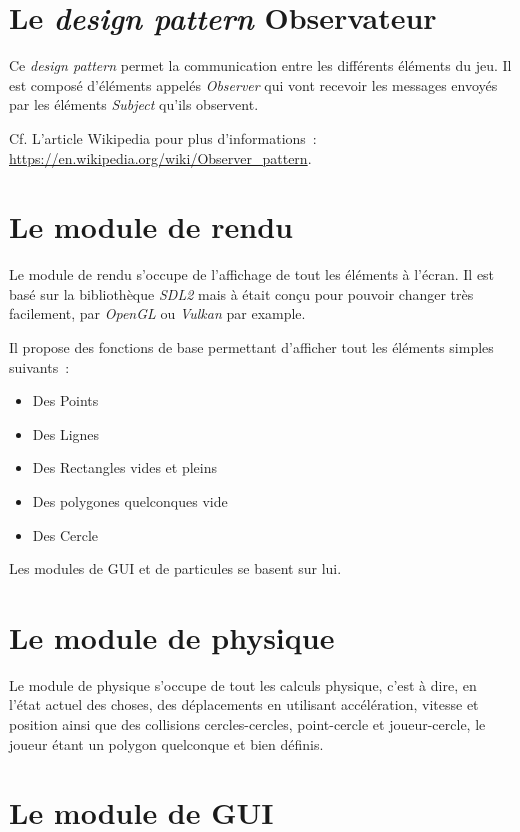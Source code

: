 \documentclass[10pt, french, a4paper]{report}
\begin{document}
\section{Le \textit{design pattern} Observateur}

Ce \textit{design pattern} permet la communication entre les différents éléments du
jeu. Il est composé d'éléments appelés \textit{Observer} qui vont \og recevoir \fg{} 
les messages envoyés par les éléments \textit{Subject} qu'ils observent.

Cf. L'article Wikipedia pour plus d'informations~: 
\url{https://en.wikipedia.org/wiki/Observer_pattern}.

\section{Le module de rendu}

Le module de rendu s'occupe de l'affichage de tout les éléments à l'écran. Il est basé
sur la bibliothèque \textit{SDL2} mais à était conçu pour pouvoir changer très facilement, 
par \textit{OpenGL} ou \textit{Vulkan} par example.

Il propose des fonctions de base permettant d'afficher tout les éléments simples 
suivants~:
\begin{itemize}
	\item Des Points
	\item Des Lignes
	\item Des Rectangles vides et pleins
	\item Des polygones quelconques vide
	\item Des Cercle
\end{itemize}

Les modules de GUI et de particules se basent sur lui.

\section{Le module de physique}

Le module de physique s'occupe de tout les calculs physique, c'est à dire, en l'état
actuel des choses, des déplacements en utilisant accélération, vitesse et position 
ainsi que des collisions cercles-cercles, point-cercle et joueur-cercle, le joueur
étant un polygon quelconque et bien définis.


\section{Le module de GUI}
\end{document}
